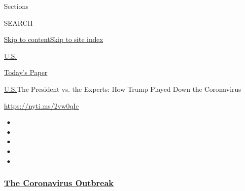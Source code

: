 Sections

SEARCH

\protect\hyperlink{site-content}{Skip to
content}\protect\hyperlink{site-index}{Skip to site index}

\href{https://www.nytimes3xbfgragh.onion/section/us}{U.S.}

\href{https://myaccount.nytimes3xbfgragh.onion/auth/login?response_type=cookie\&client_id=vi}{}

\href{https://www.nytimes3xbfgragh.onion/section/todayspaper}{Today's
Paper}

\href{/section/us}{U.S.}\textbar{}The President vs. the Experts: How
Trump Played Down the Coronavirus

\url{https://nyti.ms/2vw0qIe}

\begin{itemize}
\item
\item
\item
\item
\item
\end{itemize}

\hypertarget{the-coronavirus-outbreak}{%
\subsubsection{\texorpdfstring{\href{https://www.nytimes3xbfgragh.onion/news-event/coronavirus?name=styln-coronavirus-national\&region=TOP_BANNER\&block=storyline_menu_recirc\&action=click\&pgtype=Interactive\&impression_id=a5a67830-f4c0-11ea-914c-697b59664264\&variant=undefined}{The
Coronavirus
Outbreak}}{The Coronavirus Outbreak}}\label{the-coronavirus-outbreak}}

